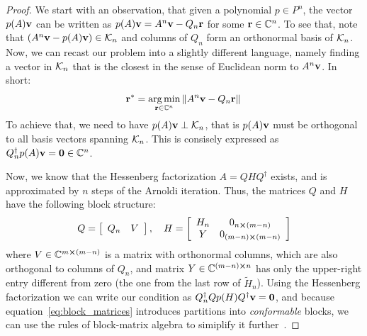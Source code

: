 \begin{proof}
	We start with an observation, that given a polynomial \(p\in P^n\), the vector \(p(A)\vectorbold{v}\)
	can be written as \(p(A)\vectorbold{v} = A^n \vectorbold{v} - Q_n \vectorbold{r}\) for some \(\vectorbold{r}\in \CC^n\).
	To see that, note that \(\left(A^n \vectorbold{v} - p(A)\vectorbold{v}\right) \in \K{n}\) and columns of \(Q_n\) form an
	orthonormal basis of \(\mathcal{K}_{n}\). Now, we can recast our problem into a slightly different language, namely finding a vector
	in \(\mathcal{K}_{n}\) that is the closest in the sense of Euclidean norm to \(A^n \vectorbold{v}\). In short:
	\begin{equation*}
		\vectorbold{r}^{\ast} = \operatorname*{arg\,min}_{\vectorbold{r}\in\CC^n}\norm*{A^n \vectorbold{v} - Q_n \vectorbold{r}}
	\end{equation*}
	To achieve that, we need to have \(p(A)\vectorbold{v}\perp \K{n}\), that is \(p(A)\vectorbold{v}\) must
	be orthogonal to all basis vectors spanning \(\mathcal{K}_{n}\). This is consisely expressed as
	\(Q^{\dagger}_{n} p(A)\vectorbold{v} = \vectorbold{0}\in \CC^n\).

	Now, we know that the Hessenberg factorization \(A = QHQ^{\dagger}\) exists, and is approximated by \(n\) steps
	of the Arnoldi iteration. Thus, the matrices \(Q\) and \(H\) have the following block structure:
	\begin{equation*}
		Q=\left[\begin{array}{ll}
				Q_n & V
			\end{array}\right],
		\quad H=\left[\begin{array}{cc}
				H_n & 0_{n\cross(m-n)}     \\
				Y   & 0_{(m-n)\cross(m-n)}
			\end{array}\right]
		\label{eq:block_matrices}
	\end{equation*}
	where \(V \in \mathbb{C}^{m\cross(m-n)}\) is a matrix with orthonormal columns, which are also orthogonal to columns of
	\(Q_n\), and matrix \(Y\in\mathbb{C}^{(m-n)\cross n}\) has only the upper-right entry different from zero
	(the one from the last row of \(\tilde{H}_n\)). Using the Hessenberg factorization we can write our condition
	as \(Q_n^{\dagger} Q p(H) Q^{\dagger}\vectorbold{v} = \vectorbold{0}\), and because equation~\eqref{eq:block_matrices}
	introduces partitions into \textit{conformable} blocks, we can use the rules of block-matrix algebra to simiplify
	it further~\autocite{Eves1980}.


\end{proof}

